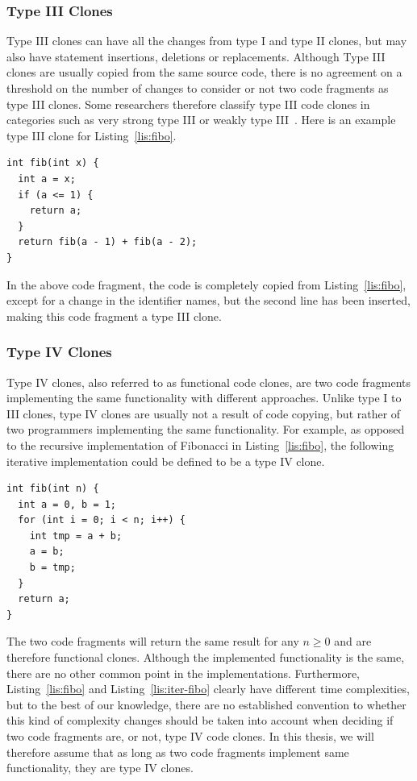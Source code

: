 \subsubsection{Type III Clones}
Type III clones can have all the changes from type I and type II clones, but
may also have statement insertions, deletions or replacements.
Although Type III clones are usually copied from the same source code,
there is no agreement on a threshold on the number of changes to consider or not
two code fragments as type III clones. Some researchers therefore classify
type III code clones in categories such as very strong type III or weakly type
III~\cite{Sajnani:2016:SSC:2884781.2884877}.
Here is an example type III clone for Listing~\ref{lis:fibo}.
%
\begin{lstlisting}
int fib(int x) {
  int a = x;
  if (a <= 1) {
    return a;
  }
  return fib(a - 1) + fib(a - 2);
}
\end{lstlisting}

In the above code fragment, the code is completely copied from
Listing~\ref{lis:fibo}, except for a change in the identifier names, but the
second line has been inserted, making this code fragment a type III clone.
\subsubsection{Type IV Clones}
Type IV clones, also referred to as functional code clones, are two code
fragments implementing the same functionality with different approaches.
Unlike type I to III clones, type IV clones are usually not a result of
code copying, but rather of two programmers implementing the same functionality.
For example, as opposed to the recursive implementation of Fibonacci in
Listing~\ref{lis:fibo}, the following iterative implementation could be defined
to be a type IV clone.
\begin{lstlisting}[caption=Iterative Fibonacci,label=lis:iter-fibo]
int fib(int n) {
  int a = 0, b = 1;
  for (int i = 0; i < n; i++) {
    int tmp = a + b;
    a = b;
    b = tmp;
  }
  return a;
}
\end{lstlisting}
The two code fragments will return the same result for any $n \geq 0$ and are
therefore functional clones. Although the implemented functionality
is the same, there are no other common point in the implementations.
Furthermore, Listing~\ref{lis:fibo} and Listing~\ref{lis:iter-fibo} clearly
have different time complexities, but to the best of our knowledge, there
are no established convention to whether this kind of complexity changes
should be taken into account when deciding if two code fragments are, or not,
type IV code clones. In this thesis, we will therefore assume that as long
as two code fragments implement same functionality, they are type IV clones.
